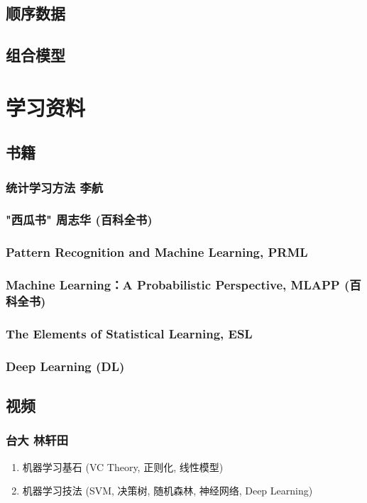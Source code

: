 \documentclass[11pt]{article}
\begin{document}
\subsection{顺序数据}
\label{sec:orgaa35ce9}
\subsection{组合模型}
\label{sec:org3740017}
\section{学习资料}
\label{sec:orgdffa043}
\subsection{书籍}
\label{sec:org2ed51b4}
\subsubsection{统计学习方法 李航}
\label{sec:org89d006d}
\subsubsection{"西瓜书" 周志华 (百科全书)}
\label{sec:orgad70185}
\subsubsection{Pattern Recognition and Machine Learning, PRML}
\label{sec:org082fabb}
\subsubsection{Machine Learning：A Probabilistic Perspective, MLAPP (百科全书)}
\label{sec:org9fef3c6}
\subsubsection{The Elements of Statistical Learning, ESL}
\label{sec:org4c8e872}
\subsubsection{Deep Learning (DL)}
\label{sec:org364a2a3}
\subsection{视频}
\label{sec:orga2648fe}
\subsubsection{台大 林轩田}
\label{sec:orgafe4052}
\begin{enumerate}
\item 机器学习基石 (VC Theory, 正则化, 线性模型)
\label{sec:orgab1316a}
\item 机器学习技法 (SVM, 决策树, 随机森林, 神经网络, Deep Learning)
\label{sec:org8f5edbd}
\end{enumerate}
\end{document}
